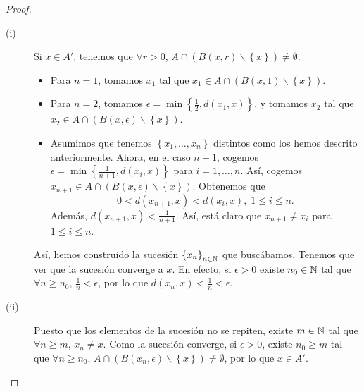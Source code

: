 \begin{proof}
\begin{description}
	\item[(i)] Si $\displaystyle x \in A' $, tenemos que $\displaystyle \forall r> 0 $, $\displaystyle A \cap \left(B\left(x,r\right)\backslash \left\{ x\right\} \right) \neq \emptyset $. 
		\begin{itemize}
			\item Para $\displaystyle n = 1 $, tomamos $\displaystyle x_{1} $ tal que $\displaystyle x_{1} \in A \cap \left(B\left(x,1\right) \backslash \left\{ x\right\} \right) $.
			\item Para $\displaystyle n = 2 $, tomamos $\displaystyle \epsilon = \min \left\{ \frac{1}{2}, d\left(x_{1}, x\right)\right\}  $, y tomamos $\displaystyle x_{2} $ tal que $\displaystyle x_{2} \in A \cap \left(B\left(x,\epsilon \right) \backslash \left\{ x\right\} \right) $.
			\item Asumimos que tenemos $\displaystyle \left\{ x_{1}, \ldots, x_{n}\right\}  $ distintos como los hemos descrito anteriormente. Ahora, en el caso $\displaystyle n +1 $, cogemos $\displaystyle \epsilon = \min \left\{ \frac{1}{n+1}, d\left(x_{i}, x\right)\right\}  $ para $\displaystyle i = 1, \ldots, n $. Así, cogemos $\displaystyle x_{n+1} \in A \cap \left(B\left(x,\epsilon \right)\backslash \left\{ x\right\} \right)  $. Obtenemos que
				\[0 < d\left(x_{n+1}, x\right)  < d\left(x_{i}, x\right), \; 1 \leq i \leq n .\]
				Además, $\displaystyle d\left(x_{n+1}, x\right)<\frac{1}{n + 1} $. Así, está claro que $\displaystyle x_{n+1} \neq x_{i} $ para $\displaystyle 1 \leq i \leq n $.
		\end{itemize}
		Así, hemos construido la sucesión $\displaystyle \left\{ x_{n}\right\} _{n\in\mathbb{N}} $ que buscábamos. Tenemos que ver que la sucesión converge a $\displaystyle x $. En efecto, si $\displaystyle \epsilon > 0 $ existe $\displaystyle n_{0} \in \mathbb{N} $ tal que $\displaystyle \forall n \geq n_{0} $, $\displaystyle \frac{1}{n} < \epsilon  $, por lo que $\displaystyle d\left(x_{n}, x\right)<\frac{1}{n} < \epsilon  $.
	\item[(ii)] Puesto que los elementos de la sucesión no se repiten, existe $\displaystyle m \in \mathbb{N} $ tal que $\displaystyle \forall n \geq m $, $\displaystyle x_{n} \neq x $. Como la sucesión converge, si $\displaystyle \epsilon > 0 $, existe $\displaystyle n_{0} \geq m$ tal que $\displaystyle \forall n \geq n_{0} $, $\displaystyle A \cap \left(B\left(x_{n}, \epsilon\right) \backslash \left\{ x\right\} \right) \neq \emptyset $, por lo que $\displaystyle x \in A' $.
\end{description}
\end{proof}
